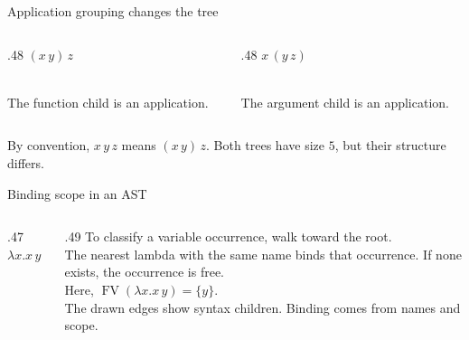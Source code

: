 \documentclass[aspectratio=169,11pt]{beamer}
\newcommand{\FV}{\operatorname{FV}}
\begin{document}
\begin{frame}{Application grouping changes the tree}
\begin{columns}[T]
\begin{column}{.48\textwidth}\centering
$(x\,y)\,z$\\[1em]
\\[1em]
The function child is an application.
\end{column}
\begin{column}{.48\textwidth}\centering
$x\,(y\,z)$\\[1em]
\\[1em]
The argument child is an application.
\end{column}
\end{columns}
\vfill
By convention, $x\,y\,z$ means $(x\,y)\,z$. Both trees have size $5$, but their structure differs.
\end{frame}

\begin{frame}{Binding scope in an AST}
\begin{columns}[c]
\begin{column}{.47\textwidth}\centering
$\lambda x.x\,y$\\[1em]
\end{column}
\begin{column}{.49\textwidth}
To classify a variable occurrence, walk toward the root.\\[1em]
The nearest lambda with the same name binds that occurrence. If none exists, the occurrence is free.\\[1em]
Here, $\FV(\lambda x.x\,y)=\{y\}$.\\[1em]
The drawn edges show syntax children. Binding comes from names and scope.
\end{column}
\end{columns}
\end{frame}
\end{document}
